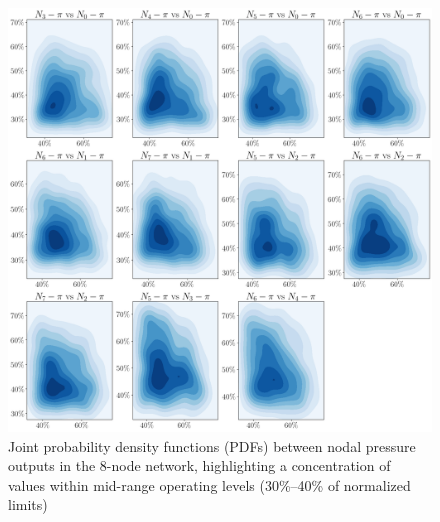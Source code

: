 \begin{figure}[htbp]
    \begin{center}
        \includegraphics[width=.7\textwidth]{figures/Chapter_NonLinealCensnet/outputs_outputs_3.png}
    \end{center}
    \caption{Joint probability density functions (PDFs) between nodal pressure outputs in the 8-node network, highlighting a concentration of values within mid-range operating levels (30\%–40\% of normalized limits)}
    \label{fig:joint_distributions_output_output_3}
\end{figure}
 


